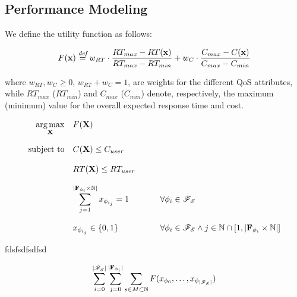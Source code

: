 \subsection{Performance Modeling}






We define the utility function as follows:

\begin{equation}
	F(\textbf{x}) \overset{\textit{def}}{=} w_{RT} \cdot \dfrac{RT_{max} - RT(\textbf{x})}{RT_{max} - RT_{min}} + w_{C} \cdot \dfrac{C_{max} - C(\textbf{x})}{C_{max} - C_{min}}
\end{equation}

where $w_{RT}, w_{C} \geq 0$, $w_{RT} + w_{C} = 1$, are weights for the different QoS attributes, while $RT_{max}$ ($RT_{min}$) and $C_{max}$ ($C_{min}$) denote, respectively, the maximum (minimum) value for the overall expected response time and cost.


\begin{equation}
\begin{array} {rll} 
\displaystyle \operatorname*{arg\,max}_\textbf{X} & F(\textbf{X}) \\\\
\text{subject to} & C(\textbf{X}) \leq C_{user} \\\\
	              & RT(\textbf{X}) \leq RT_{user} \\\\              
	              & \displaystyle \sum_{j = 1}^{|\textbf{F}_{\phi_{i}} \times \mathbb{N}|} x_{\phi_{i_{j}}} = 1 & \qquad \forall \phi_{i} \in \mathscr{F_E} \\\\
				  & x_{\phi_{i_{j}}} \in \lbrace 0, 1 \rbrace & \qquad \forall \phi_{i} \in \mathscr{F_E} \wedge j \in \mathbb{N} \cap [1,|\textbf{F}_{\phi_{i}} \times \mathbb{N}|]
\end{array}
\end{equation}

fdsfsdfsdfsd

\begin{equation}
\displaystyle 
\sum_{i = 0}^{|\mathscr{F_E}|} 
\sum_{j = 0}^{|\textbf{F}_{\phi_i}|} 
\sum_{s \in M \subset \mathbb{N} } 
F(x_{\phi_{0}}, \ldots, x_{\phi_{|\mathscr{F_E}|}}) 
\end{equation}
















